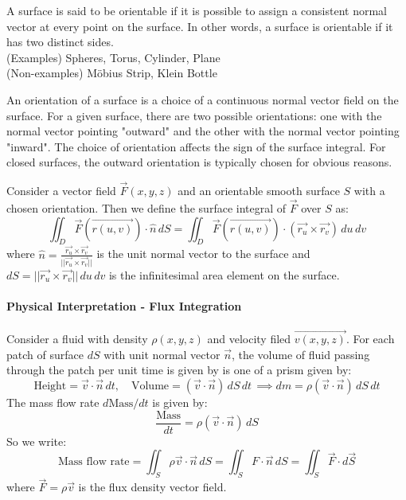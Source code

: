 \documentclass[11pt]{report}
\begin{document}
\begin{definition}[Orientability]
    A surface is said to be orientable if it is possible to assign a consistent normal vector at every point on the surface. In other words, a surface is orientable if it has two distinct sides. \\
    (Examples) Spheres, Torus, Cylinder, Plane \\    
    (Non-examples) Möbius Strip, Klein Bottle
\end{definition}

\begin{definition}[Orientation]
    An orientation of a surface is a choice of a continuous normal vector field on the surface. For a given surface, there are two possible orientations: one with the normal vector pointing "outward" and the other with the normal vector pointing "inward". The choice of orientation affects the sign of the surface integral. For closed surfaces, the outward orientation is typically chosen for obvious reasons.
\end{definition}
\begin{definition}
    Consider a vector field \(\vec{F}(x,y,z)\) and an orientable smooth surface \(S\) with a chosen orientation. Then we define the surface integral of \(\vec{F}\) over \(S\) as:
    \begin{equation}
        \iint_D \vec{F}(\vec{r(u,v)}) \cdot \hat{n} \, dS = \iint_D \vec{F}(\vec{r(u,v)}) \cdot (\vec{r_u} \times \vec{r_v}) \, du \, dv
    \end{equation}
    where $\hat{n} = \frac{\vec{r_u} \times \vec{r_v}}{||\vec{r_u} \times \vec{r_v}||}$ is the unit normal vector to the surface and $dS = ||\vec{r_u} \times \vec{r_v}|| \, du \, dv$ is the infinitesimal area element on the surface.
\end{definition}

\paragraph{Physical Interpretation - Flux Integration} Consider a fluid with density $\rho (x, y, z)$ and velocity filed $\vec{v(x, y, z)}$. For each patch of surface $dS$ with unit normal vector $\vec{n}$, the volume of fluid passing through the patch per unit time is given by is one of a prism given by:
$$
     \text{Height} = \vec{v} \cdot \vec{n} \, dt, \quad \text{Volume} = (\vec{v} \cdot \vec{n}) \, dS \, dt \, \implies dm = \rho (\vec{v} \cdot \vec{n}) \, dS \, dt
$$
The mass flow rate $d\text{Mass}/dt$ is given by:
$$
    \frac{\text{Mass}}{dt} = \rho (\vec{v} \cdot \vec{n}) \, dS
$$
So we write:
$$
    \text{Mass flow rate} = \iint_S \rho \vec{v} \cdot \vec{n}\, dS = \iint_S F \cdot \vec{n} \, dS = \iint_S \vec{F} \cdot d\vec{S}
$$
where $\vec{F} = \rho \vec{v}$ is the flux density vector field.
\end{document}

